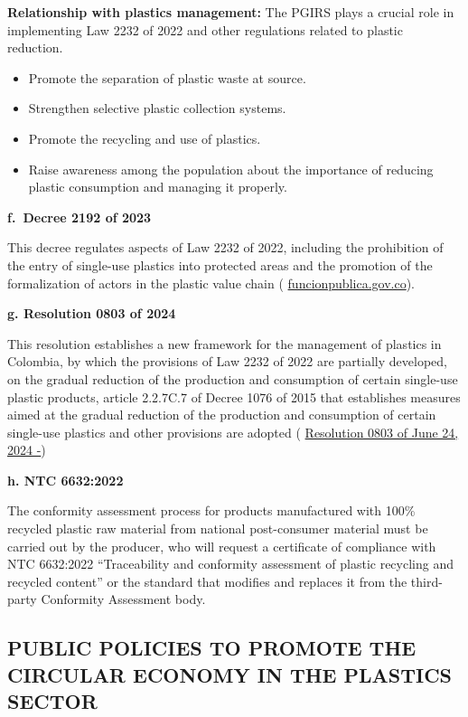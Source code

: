 \documentclass[
  12pt,
  oneside]{book}
\providecommand{\tightlist}{%
  \setlength{\itemsep}{0pt}\setlength{\parskip}{0pt}}
\begin{document}
\textbf{Relationship with plastics management:} The PGIRS plays a
crucial role in implementing Law 2232 of 2022 and other regulations
related to plastic reduction.

\begin{itemize}
\tightlist
\item
  Promote the separation of plastic waste at source.
\item
  Strengthen selective plastic collection systems.
\item
  Promote the recycling and use of plastics.
\item
  Raise awareness among the population about the importance of reducing
  plastic consumption and managing it properly.
\end{itemize}

\textbf{f.~Decree 2192 of 2023 }

This decree regulates aspects of Law 2232 of 2022, including the
prohibition of the entry of single-use plastics into protected areas and
the promotion of the formalization of actors in the plastic value chain
(
\href{https://www.funcionpublica.gov.co/eva/gestornormativo/norma.php?i=227250&utm_source=chatgpt.com}{funcionpublica.gov.co}{).}

\textbf{g. Resolution 0803 of 2024 }

This resolution establishes a new framework for the management of
plastics in Colombia, by which the provisions of Law 2232 of 2022 are
partially developed, on the gradual reduction of the production and
consumption of certain single-use plastic products, article 2.2.7C.7 of
Decree 1076 of 2015 that establishes measures aimed at the gradual
reduction of the production and consumption of certain single-use
plastics and other provisions are adopted (
\href{https://www.minambiente.gov.co/documento-normativa/resolucion-0803-del-24-de-junio-de-2024/}{Resolution
0803 of June 24, 2024 -}{)}

\textbf{h. NTC 6632:2022 }

The conformity assessment process for products manufactured with 100\%
recycled plastic raw material from national post-consumer material must
be carried out by the producer, who will request a certificate of
compliance with NTC 6632:2022 ``Traceability and conformity assessment
of plastic recycling and recycled content'' or the standard that
modifies and replaces it from the third-party Conformity Assessment
body.

\subsection{PUBLIC POLICIES TO PROMOTE THE CIRCULAR ECONOMY IN THE
PLASTICS
SECTOR}\label{public-policies-to-promote-the-circular-economy-in-the-plastics-sector-1}
\end{document}
